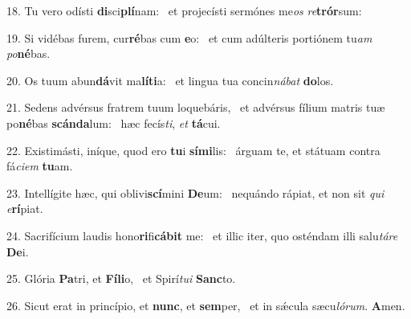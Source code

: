 18. Tu vero odísti \textbf{di}sci\textbf{plí}nam: \ast\  et projecísti sermónes me\textit{os} \textit{re}\textbf{trór}sum:\

19. Si vidébas furem, cur\textbf{ré}bas cum \textbf{e}o: \ast\  et cum adúlteris portiónem tu\textit{am} \textit{po}\textbf{né}bas.\

20. Os tuum abun\textbf{dá}vit ma\textbf{lí}\textbf{ti}a: \ast\  et lingua tua concin\textit{ná}\textit{bat} \textbf{do}los.\

21. Sedens advérsus fratrem tuum loquebáris, \dag\  et advérsus fílium matris tuæ po\textbf{né}bas \textbf{scán}\textbf{da}lum: \ast\  hæc fecís\textit{ti}, \textit{et} \textbf{tá}cui.\

22. Existimásti, iníque, quod ero \textbf{tu}i \textbf{sí}\textbf{mi}lis: \ast\  árguam te, et státuam contra fá\textit{ci}\textit{em} \textbf{tu}am.\

23. Intellígite hæc, qui oblivi\textbf{scí}mini \textbf{De}um: \ast\  nequándo rápiat, et non sit \textit{qui} \textit{e}\textbf{rí}piat.\

24. Sacrifícium laudis hono\textbf{ri}fi\textbf{cá}\textbf{bit} me: \ast\  et illic iter, quo osténdam illi salu\textit{tá}\textit{re} \textbf{De}i.\

25. Glória \textbf{Pa}tri, et \textbf{Fí}\textbf{li}o, \ast\  et Spirí\textit{tu}\textit{i} \textbf{Sanc}to.\

26. Sicut erat in princípio, et \textbf{nunc}, et \textbf{sem}per, \ast\  et in sǽcula sæcu\textit{ló}\textit{rum}. \textbf{A}men.\


